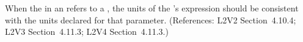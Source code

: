 When the  in an \InitialAssignment refers to a \Parameter,
the units of the \InitialAssignment's  expression should be
consistent with the units declared for that parameter.  (References: L2V2
Section~4.10.4; L2V3 Section~4.11.3; L2V4 Section~4.11.3.)

